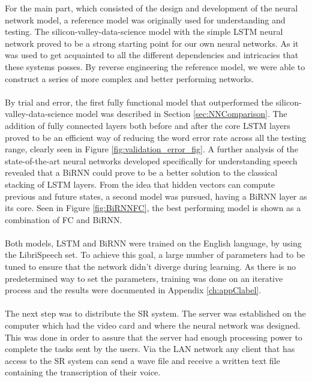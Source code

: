 For the main part, which consisted of the design and development of the neural network model, a reference model was originally used for understanding and testing. The silicon-valley-data-science model with the simple LSTM neural network proved to be a strong starting point for our own neural networks. As it was used to get acquainted to all the different dependencies and intricacies that these systems posses. By reverse engineering the reference model, we were able to construct a series of more complex and better performing networks.\\\\ 
By trial and error, the first fully functional model that outperformed the silicon-valley-data-science model was described in Section \ref{sec:NNComparison}. The addition of fully connected layers both before and after the core LSTM layers proved to be an efficient way of reducing the word error rate across all the testing range, clearly seen in Figure \ref{fig:validation_error_fig}. A further analysis of the state-of-the-art neural networks developed specifically for understanding speech revealed that a BiRNN could prove to be a better solution to the classical stacking of LSTM layers. From the idea that hidden vectors can compute previous and future states, a second model was pursued, having a BiRNN layer as its core. Seen in Figure \ref{fig:BiRNNFC}, the best performing model is shown as a combination of FC and BiRNN. \\\\
Both models, LSTM and BiRNN were trained on the English language, by using the LibriSpeech set. To achieve this goal, a large number of parameters had to be tuned to ensure that the network didn't diverge during learning. As there is no predetermined way to set the parameters, training was done on an iterative process and the results were documented in Appendix \ref{ch:appClabel}.\\\\
The next step was to distribute the SR system. The server was established on the computer which had the video card and where the neural network was designed. This was done in order to assure that the server had enough processing power to complete the tasks sent by the users. Via the LAN network any client that has access to the SR system can send a wave file and receive a written text file containing the transcription of their voice.

